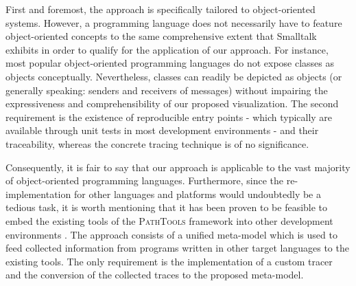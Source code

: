 First and foremost, the approach is specifically tailored to object-oriented systems.
However, a programming language does not necessarily have to feature object-oriented concepts to the same comprehensive extent that Smalltalk exhibits in order to qualify for the application of our approach.
For instance, most popular object-oriented programming languages do not expose classes as objects conceptually. 
Nevertheless, classes can readily be depicted as objects (or generally speaking: senders and receivers of messages) without impairing the expressiveness and comprehensibility of our proposed visualization.
The second requirement is the existence of reproducible entry points - which typically are available through unit tests in most development environments - and their traceability, whereas the concrete tracing technique is of no significance.

Consequently, it is fair to say that our approach is applicable to the vast majority of object-oriented programming languages.
Furthermore, since the re-implementation for other languages and platforms would undoubtedly be a tedious task, it is worth mentioning that it has been proven to be feasible to embed the existing tools of the \textsc{PathTools} framework into other development environments \cite{richter_integration_2013}.
The approach consists of a unified meta-model which is used to feed collected information from programs written in other target languages to the existing tools.
The only requirement is the implementation of a custom tracer and the conversion of the collected traces to the proposed meta-model.
